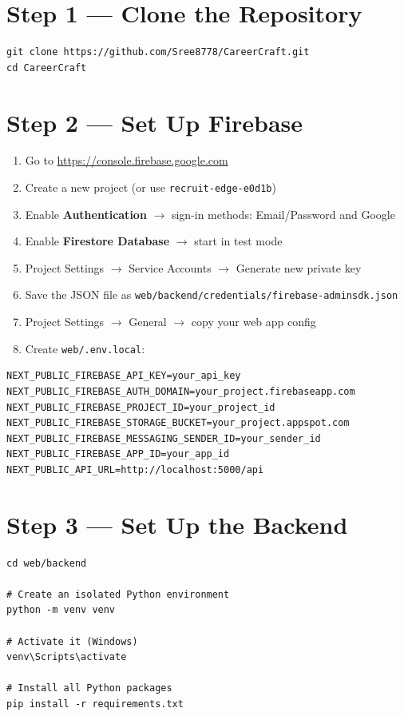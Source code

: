 \documentclass[12pt, a4paper]{report}
\newcommand{\code}[1]{\texttt{\small #1}}
\newcommand{\filepath}[1]{\texttt{\small\color{ccpurpledk}#1}}
\begin{document}
\section{Step 1 --- Clone the Repository}

\begin{lstlisting}[style=bashstyle]
git clone https://github.com/Sree8778/CareerCraft.git
cd CareerCraft
\end{lstlisting}

\section{Step 2 --- Set Up Firebase}

\begin{enumerate}
  \item Go to \url{https://console.firebase.google.com}
  \item Create a new project (or use \code{recruit-edge-e0d1b})
  \item Enable \textbf{Authentication} $\to$ sign-in methods: Email/Password and Google
  \item Enable \textbf{Firestore Database} $\to$ start in test mode
  \item Project Settings $\to$ Service Accounts $\to$ Generate new private key
  \item Save the JSON file as \filepath{web/backend/credentials/firebase-adminsdk.json}
  \item Project Settings $\to$ General $\to$ copy your web app config
  \item Create \filepath{web/.env.local}:
\end{enumerate}

\begin{lstlisting}[style=envstyle]
NEXT_PUBLIC_FIREBASE_API_KEY=your_api_key
NEXT_PUBLIC_FIREBASE_AUTH_DOMAIN=your_project.firebaseapp.com
NEXT_PUBLIC_FIREBASE_PROJECT_ID=your_project_id
NEXT_PUBLIC_FIREBASE_STORAGE_BUCKET=your_project.appspot.com
NEXT_PUBLIC_FIREBASE_MESSAGING_SENDER_ID=your_sender_id
NEXT_PUBLIC_FIREBASE_APP_ID=your_app_id
NEXT_PUBLIC_API_URL=http://localhost:5000/api
\end{lstlisting}

\section{Step 3 --- Set Up the Backend}

\begin{lstlisting}[style=bashstyle]
cd web/backend

# Create an isolated Python environment
python -m venv venv

# Activate it (Windows)
venv\Scripts\activate

# Install all Python packages
pip install -r requirements.txt
\end{lstlisting}
\end{document}
